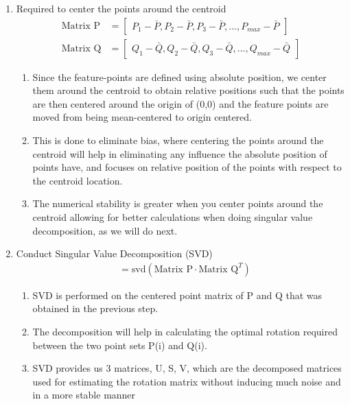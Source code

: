 \begin{enumerate}
\begin{enumerate}
    \end{enumerate}
    \item Required to center the points around the centroid
    \begin{align}
        \text{Matrix P} &= \begin{bmatrix}
            P_1 - \bar{P}, P_2 - \bar{P}, P_3 - \bar{P}, ..., P_{max} - \bar{P}
        \end{bmatrix} \\
        \text{Matrix Q} &= \begin{bmatrix}
            Q_1 - \bar{Q}, Q_2 - \bar{Q}, Q_3 - \bar{Q}, ..., Q_{max} - \bar{Q}
        \end{bmatrix}
    \end{align}
    \begin{enumerate}
        \item Since the feature-points are defined using absolute position, we center them around the centroid to obtain relative positions such that the points are then centered around the origin of (0,0) and the feature points are moved from being mean-centered to origin centered.
        \item This is done to eliminate bias, where centering the points around the centroid will help in eliminating any influence the absolute position of points have, and focuses on relative position of the points with respect to the centroid location.
        \item The numerical stability is greater when you center points around the centroid allowing for better calculations when doing singular value decomposition, as we will do next.
    \end{enumerate}
    \item Conduct Singular Value Decomposition (SVD)
    \begin{align}
        [U, S, V] &= \text{svd}(\text{Matrix P} \cdot \text{Matrix Q}^T)
    \end{align}
    \begin{enumerate}
        \item SVD is performed on the centered point matrix of P and Q that was obtained in the previous step.
        \item The decomposition will help in calculating the optimal rotation required between the two point sets P(i) and Q(i).
        \item SVD provides us 3 matrices, U, S, V, which are the decomposed matrices used for estimating the rotation matrix without inducing much noise and in a more  stable manner

\end{enumerate}
\end{enumerate}
